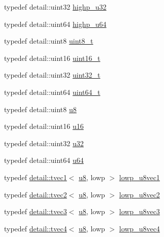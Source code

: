 \begin{DoxyCompactItemize}
\item 
typedef detail\-::uint32 \hyperlink{group__gtc__type__precision_gae8e8a2c712653891a03c171795286ac5}{highp\-\_\-u32}
\item 
typedef detail\-::uint64 \hyperlink{group__gtc__type__precision_ga6006ea883d3c0491791650b2fb84de39}{highp\-\_\-u64}
\item 
typedef detail\-::uint8 \hyperlink{group__gtc__type__precision_ga93adf6dd9803408f3e3aaf9dedda352b}{uint8\-\_\-t}
\item 
typedef detail\-::uint16 \hyperlink{group__gtc__type__precision_gac4eb4f43cae8129b00086dc234d3b8fc}{uint16\-\_\-t}
\item 
typedef detail\-::uint32 \hyperlink{group__gtc__type__precision_ga822ca53a9ad412504532838906276a99}{uint32\-\_\-t}
\item 
typedef detail\-::uint64 \hyperlink{group__gtc__type__precision_ga058f57c19e1befdcf12498944bd73e69}{uint64\-\_\-t}
\item 
typedef detail\-::uint8 \hyperlink{group__gtc__type__precision_ga5e3dc67373d5068997d2d9f41c9024d2}{u8}
\item 
typedef detail\-::uint16 \hyperlink{group__gtc__type__precision_gae7a1571503f83d2264ddfa705a6b082a}{u16}
\item 
typedef detail\-::uint32 \hyperlink{group__gtc__type__precision_ga54e837745059fd29017bed71cfa0a8db}{u32}
\item 
typedef detail\-::uint64 \hyperlink{group__gtc__type__precision_ga71cedd4972f9cb1a5e14dfe5ab83ecd7}{u64}
\item 
typedef \hyperlink{structglm_1_1detail_1_1tvec1}{detail\-::tvec1}$<$ \hyperlink{group__gtc__type__precision_ga5e3dc67373d5068997d2d9f41c9024d2}{u8}, lowp $>$ \hyperlink{group__gtc__type__precision_gaee3cba2c93fa8cb7295671908995197c}{lowp\-\_\-u8vec1}
\item 
typedef \hyperlink{structglm_1_1detail_1_1tvec2}{detail\-::tvec2}$<$ \hyperlink{group__gtc__type__precision_ga5e3dc67373d5068997d2d9f41c9024d2}{u8}, lowp $>$ \hyperlink{group__gtc__type__precision_ga8e5a056cbbcb70dca5c65950fa13a787}{lowp\-\_\-u8vec2}
\item 
typedef \hyperlink{structglm_1_1detail_1_1tvec3}{detail\-::tvec3}$<$ \hyperlink{group__gtc__type__precision_ga5e3dc67373d5068997d2d9f41c9024d2}{u8}, lowp $>$ \hyperlink{group__gtc__type__precision_gaf0d7154052c636edf4a902fc8a4a56f2}{lowp\-\_\-u8vec3}
\item 
typedef \hyperlink{structglm_1_1detail_1_1tvec4}{detail\-::tvec4}$<$ \hyperlink{group__gtc__type__precision_ga5e3dc67373d5068997d2d9f41c9024d2}{u8}, lowp $>$ \hyperlink{group__gtc__type__precision_ga98f82380862128fac9afae1b53840562}{lowp\-\_\-u8vec4}

\end{DoxyCompactItemize}
